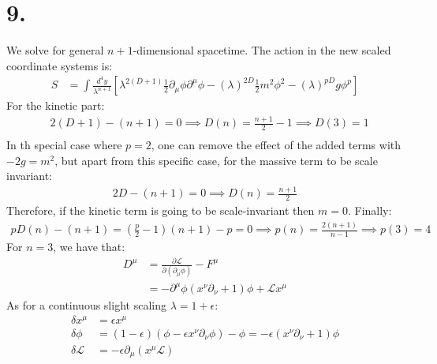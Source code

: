 \documentclass{article}
\newcommand{\pd}{\partial}  %
\newcommand{\pdm}{\partial_\mu}  %
\newcommand{\pdn}{\partial_\nu}  %
\newcommand{\pdup}{\partial^\mu}  %
\newcommand{\Lag}{\mathcal{L}}  %
\newcommand{\onehalf}{\frac{1}{2}}
\begin{document}
\section*{9.}
We solve for general $n+1$-dimensional spacetime. The action in the new
scaled coordinate systems is:
\begin{equation}
    \begin{split}
        S &= \int \frac{d^4y}{\lambda^{n+1}}\left[ \lambda^{2(D+1)}\onehalf \pdm\phi\pdup\phi - (\lambda)^{2D}\onehalf m^2\phi^2 - (\lambda)^{pD}g\phi^p  \right]
    \end{split}
\end{equation}
For the kinetic part:
\begin{equation}
    \begin{split}
        & 2(D+1)-(n+1) = 0 \implies D(n) = \frac{n+1}{2} - 1 \implies D(3) = 1\\
    \end{split}
\end{equation}
In th special case where $p=2$, one can remove the effect of the added 
terms with $-2g = m^2$, but apart from this specific case, for the massive
term to be scale invariant:
\begin{equation}
    \begin{split}
        2D - (n+1) = 0 \implies D(n) = \frac{n+1}{2} 
    \end{split}
\end{equation}
Therefore, if the kinetic term is going to be scale-invariant then $m=0$. Finally:
\begin{equation}
    \begin{split}
        pD(n) - (n+1) = (\frac{p}{2}-1)(n+1)-p = 0 \implies p(n) = \frac{2(n+1)}{n-1} \implies p(3) = 4
    \end{split}
\end{equation}
For $n=3$, we have that:
\begin{equation}
    \begin{split}
        D^\mu &= \frac{\pd \Lag }{\pd (\pdm \phi)} - F^\mu\\
        &= -\pdup\phi(x^\nu\pdn+1)\phi + \Lag x^\mu
    \end{split}
\end{equation}
As for a continuous slight scaling $\lambda = 1+\epsilon$:
\begin{equation}
    \begin{split}
        \delta x^\mu &= \epsilon x^\mu \\
        \delta\phi &= (1-\epsilon)(\phi - \epsilon x^\nu \pdn \phi) - \phi = -\epsilon(x^\nu \pdn+1)\phi \\
        \delta \Lag & =-\epsilon\pdm(x^\mu\Lag)
    \end{split}
\end{equation}
\end{document}
